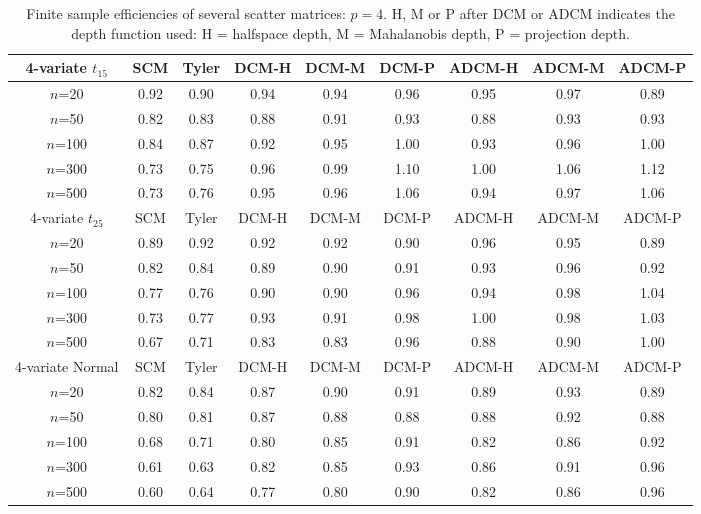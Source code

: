 \begin{table}[t]
\begin{scriptsize}
\begin{tabular}{c|cc|ccc|ccc}
    4-variate $t_{15}$ & SCM  & Tyler & DCM-H & DCM-M & DCM-P & ADCM-H & ADCM-M & ADCM-P \\ \hline
    $n$=20             & 0.92 & 0.90  & 0.94   & 0.94   & 0.96  & 0.95    & 0.97    & 0.89   \\
    $n$=50             & 0.82 & 0.83  & 0.88   & 0.91   & 0.93  & 0.88    & 0.93    & 0.93   \\
    $n$=100            & 0.84 & 0.87  & 0.92   & 0.95   & 1.00  & 0.93    & 0.96    & 1.00   \\
    $n$=300            & 0.73 & 0.75  & 0.96   & 0.99   & 1.10  & 1.00    & 1.06    & 1.12   \\
    $n$=500            & 0.73 & 0.76  & 0.95   & 0.96   & 1.06  & 0.94    & 0.97    & 1.06   \\ \hline
    4-variate $t_{25}$ & SCM  & Tyler & DCM-H & DCM-M & DCM-P & ADCM-H & ADCM-M & ADCM-P \\ \hline
    $n$=20             & 0.89 & 0.92  & 0.92   & 0.92   & 0.90  & 0.96    & 0.95    & 0.89   \\
    $n$=50             & 0.82 & 0.84  & 0.89   & 0.90   & 0.91  & 0.93    & 0.96    & 0.92   \\
    $n$=100            & 0.77 & 0.76  & 0.90   & 0.90   & 0.96  & 0.94    & 0.98    & 1.04   \\
    $n$=300            & 0.73 & 0.77  & 0.93   & 0.91   & 0.98  & 1.00    & 0.98    & 1.03   \\
    $n$=500            & 0.67 & 0.71  & 0.83   & 0.83   & 0.96  & 0.88    & 0.90    & 1.00   \\ \hline
    4-variate Normal   & SCM  & Tyler & DCM-H & DCM-M & DCM-P & ADCM-H & ADCM-M & ADCM-P \\ \hline
    $n$=20             & 0.82 & 0.84  & 0.87   & 0.90   & 0.91  & 0.89    & 0.93    & 0.89   \\
    $n$=50             & 0.80 & 0.81  & 0.87   & 0.88   & 0.88  & 0.88    & 0.92    & 0.88   \\
    $n$=100            & 0.68 & 0.71  & 0.80   & 0.85   & 0.91  & 0.82    & 0.86    & 0.92   \\
    $n$=300            & 0.61 & 0.63  & 0.82   & 0.85   & 0.93  & 0.86    & 0.91    & 0.96   \\
    $n$=500            & 0.60 & 0.64  & 0.77   & 0.80   & 0.90  & 0.82    & 0.86    & 0.96   \\ \hline
    \end{tabular}
\end{scriptsize}
\caption{Finite sample efficiencies of several scatter matrices: $p=4$. H, M or P after DCM or ADCM indicates the depth function used: H = halfspace depth, M = Mahalanobis depth, P = projection depth.}
\label{table:FSEtable4}
\end{table}

